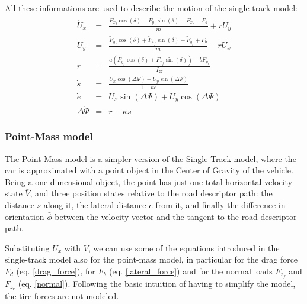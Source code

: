 \documentclass[a4paper, onecolumn, 12pt]{article}
\begin{document}
\\
All these informations are used to describe the motion of the single-track model:
\begin{subequations}
    \begin{eqnarray} 
        \dot{U}_x &=& \frac{\tilde{F}_{x_f}\cos(\delta)-\tilde{F}_{y_f}\sin(\delta)+\tilde{F}_{x_r}-F_d}{m}+rU_y\\
        \dot{U_y} &=& \frac{\tilde{F}_{y_f}\cos(\delta)+\tilde{F}_{x_f}\sin(\delta)+\tilde{F}_{y_r}+F_b}{m}-rU_x\\ 
        \dot{r} &=& \frac{a(\tilde{F}_{y_f}\cos(\delta)+\tilde{F}_{x_f}\sin(\delta))-b\tilde{F}_{y_r}}{I_{zz}}\\
        \dot{s} &=& \frac{U_x\cos(\Delta \varPsi) -U_y\sin(\Delta \varPsi)}{1-\kappa e}\\
        \dot{e} &=& U_x\sin(\Delta \varPsi)+U_y \cos(\Delta \varPsi)\\
        \Delta \dot{\varPsi} &=& r-\kappa \dot{s}
    \end{eqnarray}
\end{subequations}

\subsubsection{Point-Mass model}
The Point-Mass model is a simpler version of the Single-Track model, where the car is approximated with a point object
in the Center of Gravity of the vehicle. Being a one-dimensional object, the point has just one total horizontal velocity state $\bar{V}$, 
and three position states relative to the road descriptor path: the distance $\bar{s}$ along it, the lateral distance $\bar{e}$ from it, and finally the
difference in orientation $\bar{\phi}$ between the velocity vector and the tangent to the road descriptor path.

Substituting ${U}_x$ with $\bar{V}$, we can use some of the equations introduced in the single-track model also for the point-mass model,
in particular for the drag force ${F}_d$ (eq. \ref{drag_force}), for ${F}_b$ (eq. \ref{lateral_force}) and for the normal loads ${F}_{z_f}$ and ${F}_{z_r}$ (eq. \ref{normal}).
Following the basic intuition of having to simplify the model, the tire forces are not modeled.
\end{document}
